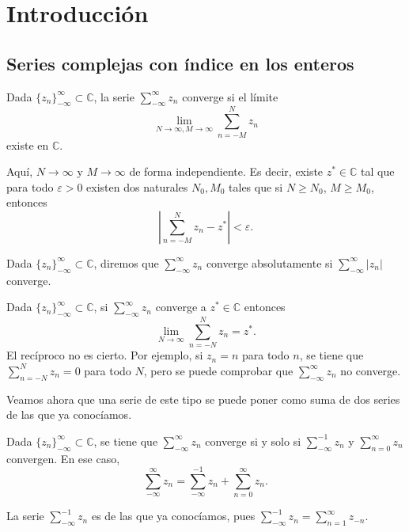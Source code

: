 \chapter{Introducción}

\section{Series complejas con índice en los enteros}
\begin{definition}
    Dada $\{z_n\}_{-\infty}^\infty \subset \mathbb{C}$, la serie $\sum_{-\infty}^\infty z_n$ converge si el límite
    $$\lim_{N \to \infty, M \to \infty} \sum_{n=-M}^N z_n$$
    existe en $\mathbb{C}$.

    Aquí, $N \to \infty$ y $M \to \infty$ de forma independiente.
    Es decir, existe $z^\ast \in \mathbb{C}$ tal que para todo $\varepsilon > 0$ existen dos naturales $N_0, M_0$ tales que si $N \geq N_0$, $M \geq M_0$, entonces
    $$\left|\sum_{n=-M}^N z_n-z^\ast\right| < \varepsilon.$$
\end{definition}

\begin{definition}
    Dada $\{z_n\}_{-\infty}^\infty \subset \mathbb{C}$, diremos que $\sum_{-\infty}^\infty z_n$ converge absolutamente si $\sum_{-\infty}^\infty |z_n|$ converge.
\end{definition}

\begin{remark}
    Dada $\{z_n\}_{-\infty}^\infty \subset \mathbb{C}$, si $\sum_{-\infty}^\infty z_n$ converge a $z^\ast \in \mathbb{C}$ entonces
    $$\lim_{N \to \infty} \sum_{n=-N}^N z_n = z^\ast.$$
    El recíproco no es cierto.
    Por ejemplo, si $z_n = n$ para todo $n$, se tiene que $\sum_{n=-N}^N z_n = 0$ para todo $N$, pero se puede comprobar que $\sum_{-\infty}^\infty z_n$ no converge.
\end{remark}

Veamos ahora que una serie de este tipo se puede poner como suma de dos series de las que ya conocíamos.

\begin{proposition}
    Dada $\{z_n\}_{-\infty}^\infty \subset \mathbb{C}$, se tiene que $\sum_{-\infty}^\infty z_n$ converge si y solo si $\sum_{-\infty}^{-1} z_n$ y $\sum_{n=0}^\infty z_n$ convergen.
    En ese caso,
    $$\sum_{-\infty}^\infty z_n = \sum_{-\infty}^{-1} z_n + \sum_{n=0}^\infty z_n.$$
\end{proposition}

\begin{remark}
    La serie $\sum_{-\infty}^{-1} z_n$ es de las que ya conocíamos, pues $\sum_{-\infty}^{-1} z_n = \sum_{n=1}^\infty z_{-n}$.
\end{remark}


